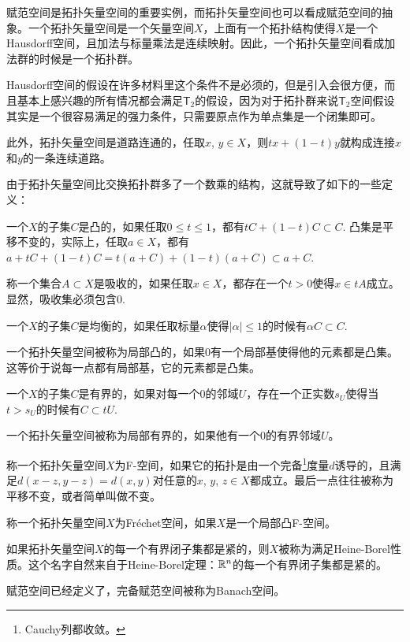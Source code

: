 \begin{para}
赋范空间是拓扑矢量空间的重要实例，而拓扑矢量空间也可以看成赋范空间的抽象。一个拓扑矢量空间是一个矢量空间$X$，上面有一个拓扑结构使得$X$是一个Hausdorff空间，且加法与标量乘法是连续映射。因此，一个拓扑矢量空间看成加法群的时候是一个拓扑群。

Hausdorff空间的假设在许多材料里这个条件不是必须的，但是引入会很方便，而且基本上感兴趣的所有情况都会满足$\mathsf{T}_2$的假设，因为对于拓扑群来说$\mathsf{T}_2$空间假设其实是一个很容易满足的强力条件，只需要原点作为单点集是一个闭集即可。

此外，拓扑矢量空间是道路连通的，任取$x$, $y\in X$，则$tx+(1-t)y$就构成连接$x$和$y$的一条连续道路。
\end{para}

\begin{para}
由于拓扑矢量空间比交换拓扑群多了一个数乘的结构，这就导致了如下的一些定义：
\begin{compactenum}
\item 一个$X$的子集$C$是凸的，如果任取$0\leq t\leq 1$，都有$tC+(1-t)C\subset C$. 凸集是平移不变的，实际上，任取$a\in X$，都有$a+tC+(1-t)C=t(a+C)+(1-t)(a+C)\subset a+C$.

\item 称一个集合$A\subset X$是吸收的，如果任取$x\in X$，都存在一个$t>0$使得$x\in tA$成立。显然，吸收集必须包含$0$.

\item 一个$X$的子集$C$是均衡的，如果任取标量$\alpha$使得$|\alpha|\leq 1$的时候有$\alpha C\subset C$.

\item 一个拓扑矢量空间被称为局部凸的，如果$0$有一个局部基使得他的元素都是凸集。这等价于说每一点都有局部基，它的元素都是凸集。

\item 一个$X$的子集$C$是有界的，如果对每一个$0$的邻域$U$，存在一个正实数$s_U$使得当$t>s_U$的时候有$C\subset tU$.

\item 一个拓扑矢量空间被称为局部有界的，如果他有一个$0$的有界邻域$U$。

\item 称一个拓扑矢量空间$X$为F-空间，如果它的拓扑是由一个完备\footnote{Cauchy列都收敛。}度量$d$诱导的，且满足$d(x-z,y-z)=d(x,y)$对任意的$x$, $y$, $z\in X$都成立。最后一点往往被称为平移不变，或者简单叫做不变。

\item 称一个拓扑矢量空间$X$为Fr\'{e}chet空间，如果$X$是一个局部凸F-空间。

\item 如果拓扑矢量空间$X$的每一个有界闭子集都是紧的，则$X$被称为满足Heine-Borel性质。这个名字自然来自于Heine-Borel定理：$\mathbb{R}^n$的每一个有界闭子集都是紧的。

\item 赋范空间已经定义了，完备赋范空间被称为Banach空间。
\end{compactenum}
\end{para}

